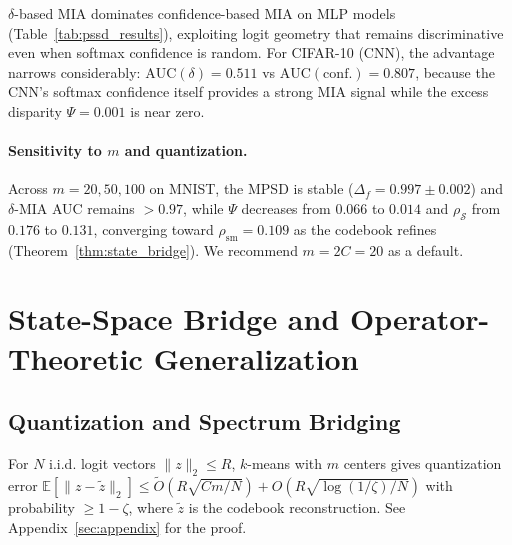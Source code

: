 \documentclass[smallextended]{svjour3}       %
\begin{document}
$\delta$-based MIA dominates confidence-based MIA on MLP models (Table~\ref{tab:pssd_results}), exploiting logit geometry that remains discriminative even when softmax confidence is random. For CIFAR-10 (CNN), the advantage narrows considerably: $\mathrm{AUC}(\delta){=}0.511$ vs $\mathrm{AUC}(\mathrm{conf.}){=}0.807$, because the CNN's softmax confidence itself provides a strong MIA signal while the excess disparity $\Psi{=}0.001$ is near zero.

\paragraph{Sensitivity to $m$ and quantization.} Across $m{=}20,50,100$ on MNIST, the MPSD is stable ($\Delta_f{=}0.997{\pm}0.002$) and $\delta$-MIA AUC remains $>0.97$, while $\Psi$ decreases from $0.066$ to $0.014$ and $\rho_{\mathcal{S}}$ from $0.176$ to $0.131$, converging toward $\rho_{\mathrm{sm}}{=}0.109$ as the codebook refines (Theorem~\ref{thm:state_bridge}). We recommend $m{=}2C{=}20$ as a default.

\section{State-Space Bridge and Operator-Theoretic Generalization}
\label{app:bridge}

\subsection{Quantization and Spectrum Bridging}

\begin{lemma}
\label{lem:quantization}
For $N$ i.i.d. logit vectors $\|z\|_2\le R$, $k$-means with $m$ centers gives quantization error $\mathbb{E}[\|z-\tilde{z}\|_2] \le \tilde{O}(R\sqrt{Cm/N}) + O(R\sqrt{\log(1/\zeta)/N})$ with probability $\ge1-\zeta$, where $\tilde{z}$ is the codebook reconstruction. See Appendix~\ref{sec:appendix} for the proof.
\end{lemma}
\end{document}
